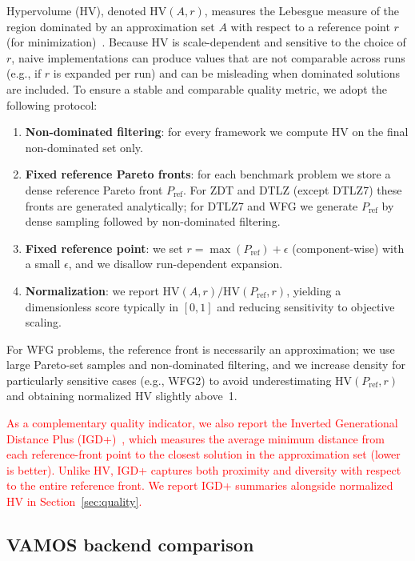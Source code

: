 \documentclass[journal]{IEEEtran}
\newcommand{\VAMOS}{VAMOS}
\newcommand{\HV}{\mathrm{HV}}
\begin{document}
Hypervolume (HV), denoted $\HV(A,r)$, measures the Lebesgue measure of the region dominated by an approximation set $A$ with respect to a reference point $r$ (for minimization)~\cite{ZTL+03}.
Because HV is scale-dependent and sensitive to the choice of $r$, naive implementations can produce values that are not comparable across runs (e.g., if $r$ is expanded per run) and can be misleading when dominated solutions are included. To ensure a stable and comparable quality metric, we adopt the following protocol:
\begin{enumerate}
  \item \textbf{Non-dominated filtering}: for every framework we compute HV on the final non-dominated set only.
  \item \textbf{Fixed reference Pareto fronts}: for each benchmark problem we store a dense reference Pareto front $P_{\text{ref}}$. For ZDT and DTLZ (except DTLZ7) these fronts are generated analytically; for DTLZ7 and WFG we generate $P_{\text{ref}}$ by dense sampling followed by non-dominated filtering.
  \item \textbf{Fixed reference point}: we set $r = \max(P_{\text{ref}}) + \epsilon$ (component-wise) with a small $\epsilon$, and we disallow run-dependent expansion.
  \item \textbf{Normalization}: we report $\HV(A,r) / \HV(P_{\text{ref}},r)$, yielding a dimensionless score typically in $[0,1]$ and reducing sensitivity to objective scaling.
\end{enumerate}
For WFG problems, the reference front is necessarily an approximation; we use large Pareto-set samples and non-dominated filtering, and we increase density for particularly sensitive cases (e.g., WFG2) to avoid underestimating $\HV(P_{\text{ref}}, r)$ and obtaining normalized HV slightly above~1.

\textcolor{red}{As a complementary quality indicator, we also report the Inverted Generational Distance Plus (IGD+)~\cite{IMT+15}, which measures the average minimum distance from each reference-front point to the closest solution in the approximation set (lower is better). Unlike HV, IGD+ captures both proximity and diversity with respect to the entire reference front. We report IGD+ summaries alongside normalized HV in Section~\ref{sec:quality}.}

\subsection{\VAMOS{} backend comparison}
\end{document}
